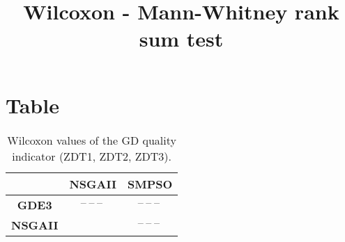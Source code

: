 \documentclass{article}
\title{Wilcoxon - Mann-Whitney rank sum test}
\author{}
\begin{document}
\maketitle
\section{Table}
\begin{table}[!htp]
  \caption{Wilcoxon values of the GD quality indicator (ZDT1, ZDT2, ZDT3).}
  \label{table:GD}
  \centering
  \begin{scriptsize}
  \begin{tabular}{c|cc}
      & \textbf{NSGAII} & \textbf{SMPSO} \\\hline
      \textbf{GDE3} & $\text{--}\ \text{--}\ \text{--}\  $ & $ \text{--}\ \text{--}\ \text{--}\ $ \\
      \textbf{NSGAII} & $ $ & $ \text{--}\ \text{--}\ \text{--}\ $ \\
  \end{tabular}
  \end{scriptsize}
\end{table}
\end{document}
